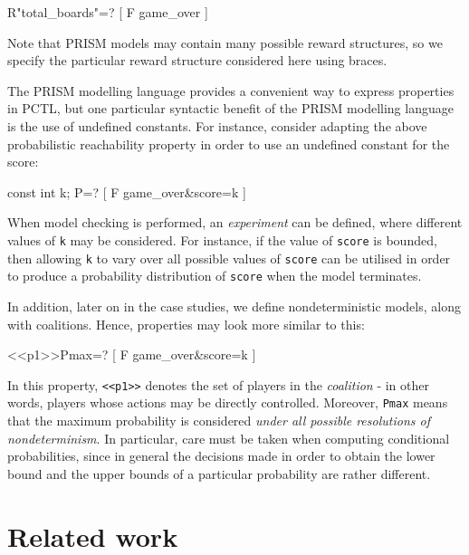 \begin{verbatim*}
    R{"total_boards"}=? [ F game_over ]
\end{verbatim*}

Note that PRISM models may contain many possible reward structures, so we specify the particular reward structure considered here using braces.

The PRISM modelling language provides a convenient way to express properties in PCTL, but one particular syntactic benefit of the PRISM modelling language is the use of undefined constants. For instance, consider adapting the above probabilistic reachability property in order to use an undefined constant for the score:

\begin{verbatim*}
    const int k;
    P=? [ F game_over&score=k ]
\end{verbatim*}

When model checking is performed, an \emph{experiment} can be defined, where different values of \verb+k+ may be considered. For instance, if the value of \verb+score+ is bounded, then allowing \verb+k+ to vary over all possible values of \verb+score+ can be utilised in order to produce a probability distribution of \verb+score+ when the model terminates.

In addition, later on in the case studies, we define nondeterministic models, along with coalitions. Hence, properties may look more similar to this:

\begin{verbatim*}
    <<p1>>Pmax=? [ F game_over&score=k ]
\end{verbatim*}

In this property, \verb+<<p1>>+ denotes the set of players in the \emph{coalition} - in other words, players whose actions may be directly controlled. Moreover, \verb+Pmax+ means that the maximum probability is considered \emph{under all possible resolutions of nondeterminism}. In particular, care must be taken when computing conditional probabilities, since in general the decisions made in order to obtain the lower bound and the upper bounds of a particular probability are rather different. 

\section{Related work}


\label{back:related}

